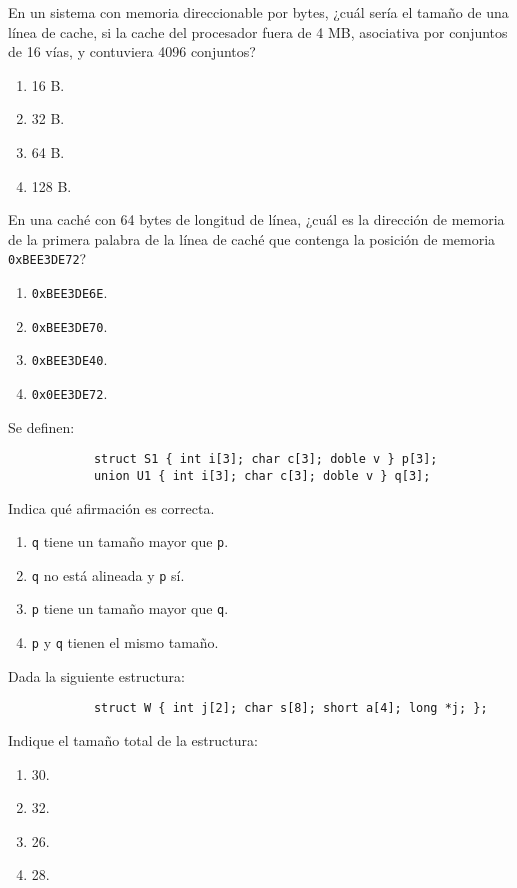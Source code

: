 \documentclass[12pt]{article}
\begin{document}
    \begin{ejercicio}
        En un sistema con memoria direccionable por bytes, ¿cuál sería el tamaño de una línea de cache, si la cache del procesador fuera de 4 MB, asociativa por conjuntos de 16 vías, y contuviera 4096 conjuntos?
        \begin{enumerate}[label=\alph*)]
            \item 16 B.
            \item 32 B.
            \item 64 B.
            \item 128 B.
        \end{enumerate}
    \end{ejercicio}
    \begin{ejercicio}
        En una caché con 64 bytes de longitud de línea, ¿cuál es la dirección de memoria de la primera palabra de la línea de caché que contenga la posición de memoria \verb|0xBEE3DE72|?
        \begin{enumerate}[label=\alph*)]
            \item \verb|0xBEE3DE6E|.
            \item \verb|0xBEE3DE70|.
            \item \verb|0xBEE3DE40|.
            \item \verb|0x0EE3DE72|.
        \end{enumerate}
    \end{ejercicio}
    \begin{ejercicio}
        Se definen:
        \begin{verbatim}
            struct S1 { int i[3]; char c[3]; doble v } p[3];
            union U1 { int i[3]; char c[3]; doble v } q[3];
        \end{verbatim}
        Indica qué afirmación es correcta.
        \begin{enumerate}[label=\alph*)]
            \item \verb|q| tiene un tamaño mayor que \verb|p|.
            \item \verb|q| no está alineada y \verb|p| sí.
            \item \verb|p| tiene un tamaño mayor que \verb|q|.
            \item \verb|p| y \verb|q| tienen el mismo tamaño.
        \end{enumerate}
    \end{ejercicio}
    \begin{ejercicio}
        Dada la siguiente estructura:
        \begin{verbatim}
            struct W { int j[2]; char s[8]; short a[4]; long *j; };
        \end{verbatim}
        Indique el tamaño total de la estructura:
        \begin{enumerate}[label=\alph*)]
            \item 30.
            \item 32.
            \item 26.
            \item 28.
        \end{enumerate}
    \end{ejercicio}
\end{document}
